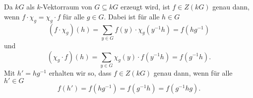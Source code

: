 \documentclass[a4paper,10pt]{article}
\begin{document}
\section{}


\subsection{}
Da $kG$ als $k$-Vektorraum von $G \subseteq kG$ erzeugt wird, ist $f \in Z(kG)$ genau dann, wenn $f \cdot \chi_g = \chi_g \cdot f$ für alle $g \in G$. Dabei ist für alle $h \in G$
\[
 (f \cdot \chi_g)(h) = \sum_{y \in G} f(y) \cdot \chi_g\left(y^{-1}h\right) = f\left(hg^{-1}\right)
\]
und
\[
 (\chi_g \cdot f)(h) = \sum_{y \in G} \chi_g(y) \cdot f\left(y^{-1}h\right) = f\left(g^{-1}h\right).
\]
Mit $h' = hg^{-1}$ erhalten wir so, dass $f \in Z(kG)$ genau dann, wenn für alle $h' \in G$
\[
 f(h') = f\left(hg^{-1}\right) = f\left(g^{-1}h\right) = f\left(g^{-1}hg\right).
\]
\end{document}

